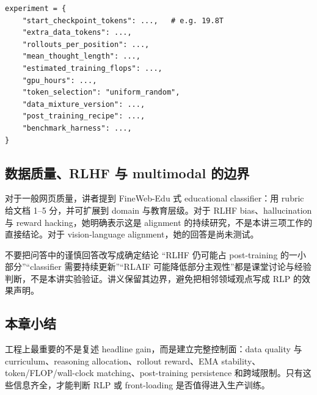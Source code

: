 

\begin{lstlisting}[caption={评估 RLP 时建议记录的最小实验表}]
experiment = {
    "start_checkpoint_tokens": ...,   # e.g. 19.8T
    "extra_data_tokens": ...,
    "rollouts_per_position": ...,
    "mean_thought_length": ...,
    "estimated_training_flops": ...,
    "gpu_hours": ...,
    "token_selection": "uniform_random",
    "data_mixture_version": ...,
    "post_training_recipe": ...,
    "benchmark_harness": ...,
}
\end{lstlisting}

\subsection{数据质量、RLHF 与 multimodal 的边界}

对于一般网页质量，讲者提到 FineWeb-Edu 式 educational classifier：用 rubric 给文档 1--5 分，并可扩展到 domain 与教育层级。对于 RLHF bias、hallucination 与 reward hacking，她明确表示这是 alignment 的持续研究，不是本讲三项工作的直接结论。对于 vision-language alignment，她的回答是尚未测试。

\begin{warningbox}{不要把问答中的谨慎回答改写成确定结论}
“RLHF 仍可能占 post-training 的一小部分”“classifier 需要持续更新”“RLAIF 可能降低部分主观性”都是课堂讨论与经验判断，不是本讲实验验证。讲义保留其边界，避免把相邻领域观点写成 RLP 的效果声明。
\end{warningbox}

\subsection{本章小结}

工程上最重要的不是复述 headline gain，而是建立完整控制面：data quality 与 curriculum、reasoning allocation、rollout reward、EMA stability、token/FLOP/wall-clock matching、post-training persistence 和跨域限制。只有这些信息齐全，才能判断 RLP 或 front-loading 是否值得进入生产训练。

